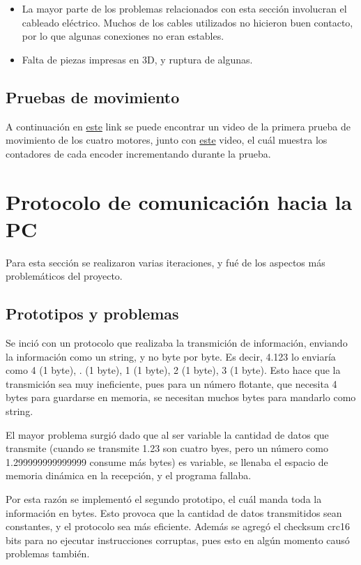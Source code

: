 \begin{itemize}
\item La mayor parte de los problemas relacionados con esta sección involucran el cableado eléctrico. Muchos de los cables utilizados no hicieron buen contacto, por lo que algunas conexiones no eran estables.
\item Falta de piezas impresas en 3D, y ruptura de algunas.
\end{itemize}

\subsection{Pruebas de movimiento}

A continuación en \href{https://photos.app.goo.gl/sycSZ52LNMN4YrVcA}{este} link se puede encontrar un video de la primera prueba de movimiento de los cuatro motores, junto con \href{https://photos.app.goo.gl/4x4wTcnVmySGP9ELA}{este} video, el cuál muestra los contadores de cada encoder incrementando durante la prueba.

\section{Protocolo de comunicación hacia la PC}

Para esta sección se realizaron varias iteraciones, y fué de los aspectos más problemáticos del proyecto.

\subsection{Prototipos y problemas}

Se inció con un protocolo que realizaba la transmición de información, enviando la información como un string, y no byte por byte. Es decir, 4.123 lo enviaría como 4 (1 byte), . (1 byte), 1 (1 byte), 2 (1 byte), 3 (1 byte). Esto hace que la transmición sea muy ineficiente, pues para un número flotante, que necesita 4 bytes para guardarse en memoria, se necesitan muchos bytes para mandarlo como string.

El mayor problema surgió dado que al ser variable la cantidad de datos que transmite (cuando se transmite 1.23 son cuatro byes, pero un número como 1.299999999999999 consume más bytes) es variable, se llenaba el espacio de memoria dinámica en la recepción, y el programa fallaba.

Por esta razón se implementó el segundo prototipo, el cuál manda toda la información en bytes. Esto provoca que la cantidad de datos transmitidos sean constantes, y el protocolo sea más eficiente. Además se agregó el checksum crc16 bits para no ejecutar instrucciones corruptas, pues esto en algún momento causó problemas también.

